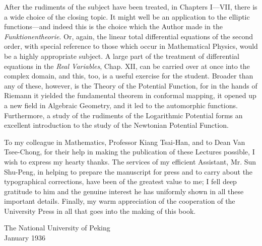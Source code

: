 After the rudiments of the subject have been treated, in Chapters I---VII, there is a wide choice of the closing topic. It might well be an application to the elliptic functions---and indeed this is the choice which the Author made in the \emph{Funktionentheorie}. Or, again, the linear total differential equations of the second order, with special reference to those which occur in Mathematical Physics, would be a highly appropriate subject. A large part of the treatment of differential equations in the \emph{Real Variables}, Chap. XII, can be carried over at once into the complex domain, and this, too, is a useful exercise for the student. Broader than any of these, however, is the Theory of the Potential Function, for in the hands of Riemann it yielded the fundamental theorem in conformal mapping, it opened up a new field in Algebraic Geometry, and it led to the automorphic functions. Furthermore, a study of the rudiments of the Logarithmic Potential forms an excellent introduction to the study of the Newtonian Potential Function.

To my colleague in Mathematics, Professor Kiang Tsai-Han, and to Dean Van Tsee-Chong, for their help in making the publication of these Lectures possible, I wish to express my hearty thanks. The services of my efficient Assistant, Mr. Sun Shu-Peng, in helping to prepare the manuscript for press and to carry about the typographical corrections, have been of the greatest value to me; I fell deep gratitude to him and the genuine interest he has uniformly shown in all these important details. Finally, my warm appreciation of the cooperation of the University Press in all that goes into the making of this book. 

\begin{flushright}
The National University of Peking\\January 1936
\end{flushright}
